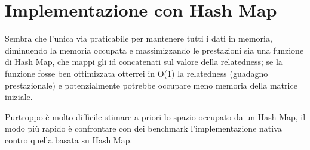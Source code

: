 \section{Implementazione con Hash Map}
Sembra che l'unica via praticabile per mantenere tutti i dati in memoria, diminuendo la memoria occupata e massimizzando le prestazioni sia una funzione di Hash Map, 
che mappi gli id concatenati sul valore della relatedness; se la funzione fosse ben ottimizzata otterrei in O(1) la relatedness (guadagno prestazionale)
e potenzialmente potrebbe occupare meno memoria della matrice iniziale.

Purtroppo è molto difficile stimare a priori lo spazio occupato da un Hash Map, 
il modo più rapido è confrontare con dei benchmark l'implementazione nativa contro quella basata su Hash Map.

